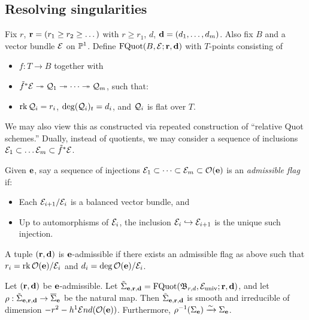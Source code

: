 \documentclass{article}
\begin{document}
\subsection{Resolving singularities}

\begin{dfn}
	Fix $r$, $\mathbf{r} = (r_1 \geq r_2 \geq \dots)$ with $r \geq r_1$, $d$, $\mathbf{d} = (d_1, \dots, d_m)$.
	Also fix $B$ and a vector bundle $\mathcal{E}$ on $\mathbb{P}^1$.
	Define $\operatorname{FQuot}(B, \mathcal{E}; \mathbf{r}, \mathbf{d})$ with $T$-points consisting of
	\begin{itemize}
		\item $f: T \to B$ together with
		\item $\tilde{f}^* \mathcal{E} \twoheadrightarrow \mathcal{Q}_1 \twoheadrightarrow \dots \twoheadrightarrow \mathcal{Q}_m$, such that:
		\item $\operatorname{rk} \mathcal{Q}_i = r_i$, $\operatorname{deg} (\mathcal{Q}_i)_t = d_i$, and $\mathcal{Q}_i$ is flat over $T$.
	\end{itemize}
\end{dfn}

We may also view this as constructed via repeated construction of ``relative Quot schemes.''
Dually, instead of quotients, we may consider a sequence of inclusions $\mathcal{E}_1 \subset \dots \mathcal{E}_m \subset \tilde{f}^* \mathcal{E}$.

\begin{dfn}
	Given $\mathbf{e}$, say a sequence of injections $\mathcal{E}_1 \subset \dots \subset \mathcal{E}_m \subset \mathcal{O}(\mathbf{e})$ is an \emph{admissible flag} if:
	\begin{itemize}
		\item Each $\mathcal{E}_{i+1} / \mathcal{E}_i$ is a balanced vector bundle, and
		\item Up to automorphisms of $\mathcal{E}_i$, the inclusion $\mathcal{E}_i \hookrightarrow \mathcal{E}_{i+1}$ is the unique such injection.
	\end{itemize}
\end{dfn}

\begin{dfn}
	A tuple $(\mathbf{r}, \mathbf{d})$ is $\mathbf{e}$-admissible if there exists an admissible flag as above such that $r_i = \operatorname{rk} \mathcal{O}(\mathbf{e}) / \mathcal{E}_i$ and $d_i = \operatorname{deg} \mathcal{O}(\mathbf{e}) / \mathcal{E}_i$.
\end{dfn}

\begin{thm}[Lin]
	Let $(\mathbf{r}, \mathbf{d})$ be $\mathbf{e}$-admissible.
	Let $\tilde{\Sigma}_{\mathbf{e}, \mathbf{r}, \mathbf{d}} = \operatorname{FQuot}(\mathfrak{B}_{r,d}, \mathcal{E}_{\mathrm{univ}}; \mathbf{r}, \mathbf{d})$, and let $\rho: \tilde{\Sigma}_{\mathbf{e}, \mathbf{r}, \mathbf{d}} \to \overline{\Sigma}_{\mathbf{e}}$ be the natural map.
  Then $\tilde{\Sigma}_{\mathbf{e}, \mathbf{r}, \mathbf{d}}$ is smooth and irreducible of dimension $-r^2 - h^1 \mathcal{E}\!\mathop{nd}(\mathcal{O}(\mathbf{e}))$.
	Furthermore, $\rho^{-1}(\Sigma_{\mathbf{e}}) \xrightarrow{\sim} \Sigma_{\mathbf{e}}$.
\end{thm}
\end{document}
